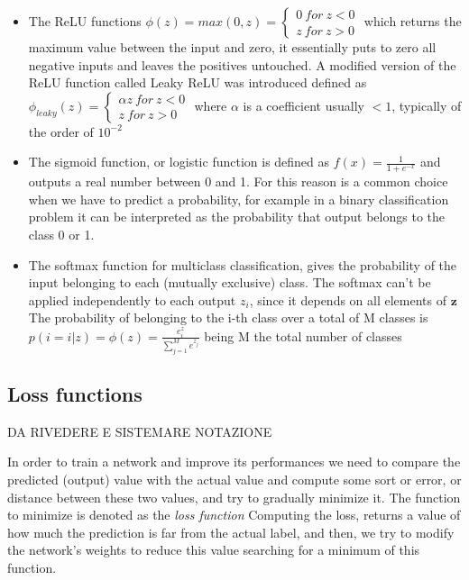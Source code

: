 \documentclass[a4paper,11pt]{article}
\begin{document}
\begin{itemize}

\item The ReLU functions $\phi(z) = max(0, z) = \begin{cases} 0 \ for \ z<0 \\ z \ for \ z>0 \end{cases}$ which returns the maximum value between the input and zero, it essentially puts to zero all negative inputs and leaves the positives untouched.
A modified version of the ReLU function called Leaky ReLU was introduced defined as
$\phi_{leaky}(z) = \begin{cases} \alpha z \ for \ z<0 \\ z \ for \ z>0 \end{cases}$ where $\alpha$ is a coefficient usually $< 1$, typically of the order of $10^{-2}$


\item The sigmoid function, or logistic function is defined as $f(x) = \frac{1}{1+e^{-x}}$ and outputs a real number between 0 and 1. For this reason is a common choice when we have to predict a probability, for example in a binary classification problem it can be interpreted as the probability that output belongs to the class 0 or 1.


\item The softmax function for multiclass classification, gives the probability of the input belonging to each (mutually exclusive) class. The softmax can't be applied independently to each output $z_i$, since it depends on all elements of $\textbf{z}$ The probability of belonging to the i-th class over a total of M classes is
$p(i = i|z) = \phi(z) = \frac{e^z_i}{\sum_{j = 1}^M e^{z_j}}$ being M the total number of classes
\end{itemize}


\subsection{Loss functions}

DA RIVEDERE E SISTEMARE NOTAZIONE

In order to train a network and improve its performances we need to compare the predicted (output) value with the actual value and compute some sort or error, or distance between these two values, and try to gradually minimize it.
The function to minimize is denoted as the \emph{loss function}
Computing the loss, returns a value of how much the prediction is far from the actual label, and then, we try to modify the network's weights to reduce this value searching for a minimum of this function.
\end{document}
